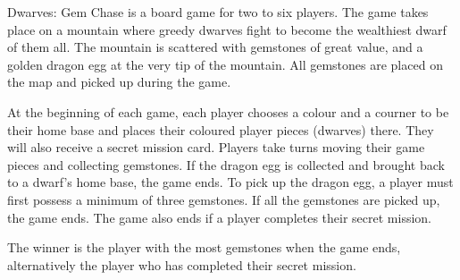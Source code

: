 \documentclass[12pt]{article}
\begin{document}
Dwarves: Gem Chase is a board game for two to six players. The game takes place on a mountain where greedy dwarves fight to become the wealthiest dwarf of them all. The mountain is scattered with gemstones of great value, and a golden dragon egg at the very tip of the mountain. All gemstones are placed on the map and picked up during the game.

At the beginning of each game, each player chooses a colour and a courner to be their home base and places their coloured player pieces (dwarves) there. They will also receive a secret mission card. Players take turns moving their game pieces and collecting gemstones. If the dragon egg is collected and brought back to a dwarf's home base, the game ends. To pick up the dragon egg, a player must first possess a minimum of three gemstones. If all the gemstones are picked up, the game ends. The game also ends if a player completes their secret mission.

The winner is the player with the most gemstones when the game ends, alternatively the player who has completed their secret mission.

\clearpage

\tableofcontents

\clearpage


%
%
%
%
%
%


\clearpage

\printbibliography
\end{document}
